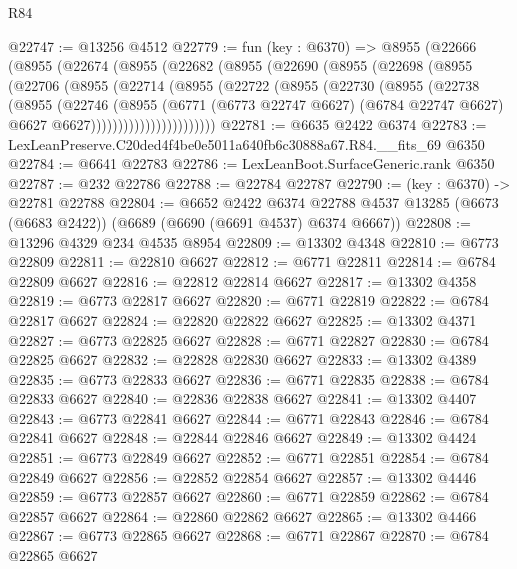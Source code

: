 \begin{lexlean}{R84}
\begin{coremodule}
@22747 := @13256 @4512
@22779 := fun (key : @6370) =>
  @8955
    (@22666
      (@8955
        (@22674
          (@8955
            (@22682
              (@8955
                (@22690
                  (@8955
                    (@22698
                      (@8955
                        (@22706
                          (@8955
                            (@22714
                              (@8955
                                (@22722
                                  (@8955
                                    (@22730
                                      (@8955
                                        (@22738
                                          (@8955
                                            (@22746
                                              (@8955
                                                (@6771
                                                  (@6773 @22747 @6627)
                                                  (@6784 @22747 @6627)
                                                  @6627
                                                  @6627)))))))))))))))))))))))
@22781 := @6635 @2422 @6374
@22783 := LexLeanPreserve.C20ded4f4be0e5011a640fb6c30888a67.R84.__fits_69 @6350
@22784 := @6641 @22783
@22786 := LexLeanBoot.SurfaceGeneric.rank @6350
@22787 := @232 @22786
@22788 := @22784 @22787
@22790 := (key : @6370) -> @22781 @22788
@22804 := @6652
    @2422
    @6374
    @22788
    @4537
    @13285
    (@6673 (@6683 @2422))
    (@6689 (@6690 (@6691 @4537) @6374 @6667))
@22808 := @13296 @4329 @234 @4535 @8954
@22809 := @13302 @4348
@22810 := @6773 @22809
@22811 := @22810 @6627
@22812 := @6771 @22811
@22814 := @6784 @22809 @6627
@22816 := @22812 @22814 @6627
@22817 := @13302 @4358
@22819 := @6773 @22817 @6627
@22820 := @6771 @22819
@22822 := @6784 @22817 @6627
@22824 := @22820 @22822 @6627
@22825 := @13302 @4371
@22827 := @6773 @22825 @6627
@22828 := @6771 @22827
@22830 := @6784 @22825 @6627
@22832 := @22828 @22830 @6627
@22833 := @13302 @4389
@22835 := @6773 @22833 @6627
@22836 := @6771 @22835
@22838 := @6784 @22833 @6627
@22840 := @22836 @22838 @6627
@22841 := @13302 @4407
@22843 := @6773 @22841 @6627
@22844 := @6771 @22843
@22846 := @6784 @22841 @6627
@22848 := @22844 @22846 @6627
@22849 := @13302 @4424
@22851 := @6773 @22849 @6627
@22852 := @6771 @22851
@22854 := @6784 @22849 @6627
@22856 := @22852 @22854 @6627
@22857 := @13302 @4446
@22859 := @6773 @22857 @6627
@22860 := @6771 @22859
@22862 := @6784 @22857 @6627
@22864 := @22860 @22862 @6627
@22865 := @13302 @4466
@22867 := @6773 @22865 @6627
@22868 := @6771 @22867
@22870 := @6784 @22865 @6627

\end{coremodule}
\end{lexlean}
